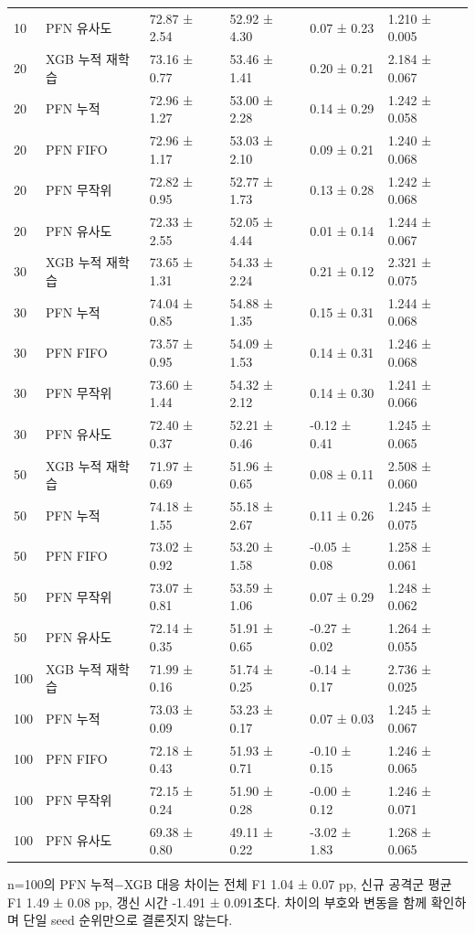\begin{longtable}
{}10 & PFN 유사도 & 72.87 ± 2.54 & 52.92 ± 4.30 & 0.07 ± 0.23 & 1.210 ± 0.005 \\
{}20 & XGB 누적 재학습 & 73.16 ± 0.77 & 53.46 ± 1.41 & 0.20 ± 0.21 & 2.184 ± 0.067 \\
{}20 & PFN 누적 & 72.96 ± 1.27 & 53.00 ± 2.28 & 0.14 ± 0.29 & 1.242 ± 0.058 \\
{}20 & PFN FIFO & 72.96 ± 1.17 & 53.03 ± 2.10 & 0.09 ± 0.21 & 1.240 ± 0.068 \\
{}20 & PFN 무작위 & 72.82 ± 0.95 & 52.77 ± 1.73 & 0.13 ± 0.28 & 1.242 ± 0.068 \\
{}20 & PFN 유사도 & 72.33 ± 2.55 & 52.05 ± 4.44 & 0.01 ± 0.14 & 1.244 ± 0.067 \\
{}30 & XGB 누적 재학습 & 73.65 ± 1.31 & 54.33 ± 2.24 & 0.21 ± 0.12 & 2.321 ± 0.075 \\
{}30 & PFN 누적 & 74.04 ± 0.85 & 54.88 ± 1.35 & 0.15 ± 0.31 & 1.244 ± 0.068 \\
{}30 & PFN FIFO & 73.57 ± 0.95 & 54.09 ± 1.53 & 0.14 ± 0.31 & 1.246 ± 0.068 \\
{}30 & PFN 무작위 & 73.60 ± 1.44 & 54.32 ± 2.12 & 0.14 ± 0.30 & 1.241 ± 0.066 \\
{}30 & PFN 유사도 & 72.40 ± 0.37 & 52.21 ± 0.46 & -0.12 ± 0.41 & 1.245 ± 0.065 \\
{}50 & XGB 누적 재학습 & 71.97 ± 0.69 & 51.96 ± 0.65 & 0.08 ± 0.11 & 2.508 ± 0.060 \\
{}50 & PFN 누적 & 74.18 ± 1.55 & 55.18 ± 2.67 & 0.11 ± 0.26 & 1.245 ± 0.075 \\
{}50 & PFN FIFO & 73.02 ± 0.92 & 53.20 ± 1.58 & -0.05 ± 0.08 & 1.258 ± 0.061 \\
{}50 & PFN 무작위 & 73.07 ± 0.81 & 53.59 ± 1.06 & 0.07 ± 0.29 & 1.248 ± 0.062 \\
{}50 & PFN 유사도 & 72.14 ± 0.35 & 51.91 ± 0.65 & -0.27 ± 0.02 & 1.264 ± 0.055 \\
{}100 & XGB 누적 재학습 & 71.99 ± 0.16 & 51.74 ± 0.25 & -0.14 ± 0.17 & 2.736 ± 0.025 \\
{}100 & PFN 누적 & 73.03 ± 0.09 & 53.23 ± 0.17 & 0.07 ± 0.03 & 1.245 ± 0.067 \\
{}100 & PFN FIFO & 72.18 ± 0.43 & 51.93 ± 0.71 & -0.10 ± 0.15 & 1.246 ± 0.065 \\
{}100 & PFN 무작위 & 72.15 ± 0.24 & 51.90 ± 0.28 & -0.00 ± 0.12 & 1.246 ± 0.071 \\
{}100 & PFN 유사도 & 69.38 ± 0.80 & 49.11 ± 0.22 & -3.02 ± 1.83 & 1.268 ± 0.065 \\
\bottomrule
\end{longtable}
\endgroup
n=\allowbreak{}100의 PFN 누적−XGB 대응 차이는 전체 F1 1.04 ± 0.07 pp, 신규 공격군 평균 F1 1.49 ± 0.08 pp, 갱신 시간 -1.491 ± 0.091초다. 차이의 부호와 변동을 함께 확인하며 단일 seed 순위만으로 결론짓지 않는다.

